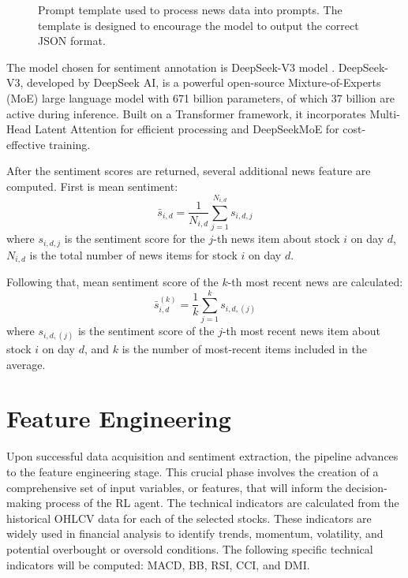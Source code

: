 \begin{figure}[!t]
  \centering
  \small
  
  \caption{Prompt template used to process news data into prompts. The template is designed to encourage the model to output the correct JSON format.}
  \label{fig:prompt}
\end{figure}

The model chosen for sentiment annotation is DeepSeek-V3 model \cite{DeepSeekV3}. DeepSeek-V3, developed by DeepSeek AI, is a powerful open-source Mixture-of-Experts (MoE) large language model with 671 billion parameters, of which 37 billion are active during inference. Built on a Transformer framework, it incorporates Multi-Head Latent Attention for efficient processing and DeepSeekMoE for cost-effective training.

After the sentiment scores are returned, several additional news feature are computed. First is mean sentiment:
\[\bar{s}_{i,d}  = \frac{1}{N_{i,d}} \sum_{j=1}^{N_{i,d}} s_{i,d,j}\]
where \(s_{i,d,j}\) is the sentiment score for the \(j\)-th news item about stock \(i\) on day \(d\), \(N_{i,d}\) is the total number of news items for stock \(i\) on day \(d\).

Following that, mean sentiment score of the \(k\)-th most recent news are calculated:
\[\bar{s}_{i,d}^{(k)} = \frac{1}{k} \sum_{j=1}^{k} s_{i,d,(j)}\]
where \(s_{i,d,(j)}\) is the sentiment score of the \(j\)-th most recent news item about stock \(i\) on day \(d\), and \(k\) is the number of most-recent items included in the average.

\section{Feature Engineering}

Upon successful data acquisition and sentiment extraction, the pipeline advances to the feature engineering stage. This crucial phase involves the creation of a comprehensive set of input variables, or features, that will inform the decision-making process of the \gls{RL} agent. The technical indicators are calculated from the historical \gls{OHLCV} data for each of the selected stocks. These indicators are widely used in financial analysis to identify trends, momentum, volatility, and potential overbought or oversold conditions. The following specific technical indicators will be computed: \gls{MACD}, \gls{BB}, \gls{RSI}, \gls{CCI}, and \gls{DMI}.

